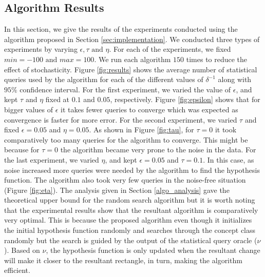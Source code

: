 \subsection{Algorithm Results}
\label{app:algo_analysis}
In this section, we give the results of the experiments conducted using the algorithm proposed in Section \ref{sec:implementation}. We conducted three types of experiments by varying $\epsilon, \tau \text{ and } \eta$. For each of the experiments, we fixed $min=-100 \text{ and } max=100$. We run each algorithm $150$ times to reduce the effect of stochasticity. Figure \ref{fig:results} shows the average number of statistical queries used by the algorithm for each of the different values of $\delta^{-1}$ along with $95\%$ confidence interval. For the first experiment, we varied the value of $\epsilon$, and kept $\tau$ and $\eta$ fixed at $0.1$ and $0.05$, respectively. Figure \ref{fig:epsilon} shows that for bigger values of $\epsilon$ it takes fewer queries to converge which was expected as convergence is faster for more error. For the second experiment, we varied $\tau$ and fixed $\epsilon=0.05$ and $\eta=0.05$. As shown in Figure \ref{fig:tau}, for $\tau=0$ it took comparatively too many queries for the algorithm to converge. This might be because for $\tau=0$ the algorithm became very prone to the noise in the data. For the last experiment, we varied $\eta$, and kept $\epsilon=0.05$ and $\tau=0.1$. In this case, as noise increased more queries were needed by the algorithm to find the hypothesis function. The algorithm also took very few queries in the noise-free situation (Figure \ref{fig:eta}). The analysis given in Section \ref{algo_analysis} gave the theoretical upper bound for the random search algorithm but it is worth noting that the experimental results show that the resultant algorithm is comparatively very optimal. This is because the proposed algorithm even though it initializes the initial hypothesis function randomly and searches through the concept class randomly but the search is guided by the output of the statistical query oracle ($\nu$). Based on $\nu$, the hypothesis function is only updated when the resultant change will make it closer to the resultant rectangle, in turn, making the algorithm efficient.

